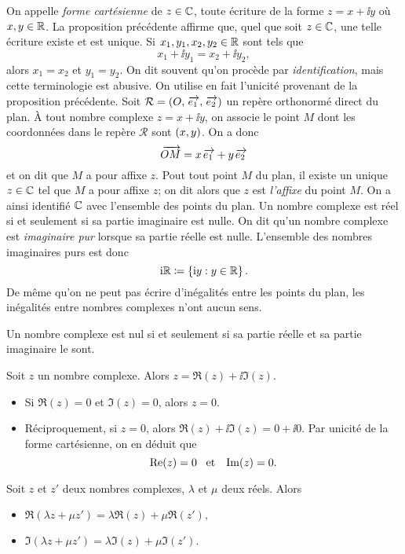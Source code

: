 \documentclass{magnolia}
\begin{document}
\begin{remarques}
\remarque On appelle \emph{forme cartésienne} de $z\in\mathbb{C}$, toute écriture de la forme $z=x+\ii y$ où $x,y\in\mathbb{R}$. La proposition précédente affirme que, quel que soit $z\in\mathbb{C}$, une telle écriture existe et est unique.
\remarque Si $x_1,y_1,x_2,y_2\in\mathbb{R}$ sont tels que
  \[x_1+\ii y_1=x_2+\ii y_2,\]
  alors $x_1=x_2$ et $y_1=y_2$. On dit souvent qu'on procède par \emph{identification}, mais cette terminologie est abusive. On utilise en fait l'unicité provenant de la proposition précédente.
\remarque Soit $\mathcal{R}=\left(O,\kern 2pt\overrightarrow{\kern -2pte_1},\kern 2pt\overrightarrow{\kern -2pte_2}\right)$ un repère orthonormé
  direct du plan. À tout nombre complexe $z=x+\ii y$, on associe le point $M$ dont les coordonnées dans le repère
  $\mathcal{R}$ sont $\left(x,y\right)$. On a donc
  \[\kern 2pt\overrightarrow{\kern -2ptOM}=x\kern 2pt\overrightarrow{\kern -2pte_1}+y\kern 2pt\overrightarrow{\kern -2pte_2}\]
  et on dit que $M$ a pour affixe $z$. Pout tout point $M$ du plan, il existe un unique $z\in\mathbb{C}$ tel que
  $M$ a pour affixe $z$; on dit alors que $z$ est \emph{l'affixe} du point $M$. On a ainsi identifié
  $\mathbb{C}$ avec l'ensemble des points du plan.
\remarque Un nombre complexe est réel si et seulement si sa partie imaginaire est nulle. On dit qu'un nombre complexe
  est \emph{imaginaire pur} lorsque sa partie réelle est nulle. L'ensemble des nombres imaginaires purs est
  donc
  \[{\rm i}\mathbb{R}\coloneqq\left\{{\rm i} y : y\in\mathbb{R}\right\}.\]
\remarque De même qu'on ne peut pas écrire d'inégalités entre les points du plan, les inégalités entre nombres
  complexes n'ont aucun sens.
\end{remarques}

\begin{proposition}[utile=-3]
Un nombre complexe est nul si et seulement si sa partie réelle et sa partie imaginaire le sont.
\end{proposition}

\begin{preuve}
Soit $z$ un nombre complexe. Alors $z=\Re(z)+\ii \Im(z)$. 
\begin{itemize}
\item Si $\Re(z)=0$ et $\Im(z)=0$, alors $z=0$.
\item Réciproquement, si $z=0$, alors $\Re(z)+\ii \Im(z)=0+\ii 0$. Par unicité de la forme cartésienne, on en déduit que
  \[\mathop{\rm Re}(z)=0 \quad\!\text{et}\quad\! \mathop{\rm Im}(z)=0.\]
\end{itemize}
\end{preuve}

\begin{proposition}[utile=-3]
Soit $z$ et $z'$ deux nombres complexes, $\lambda$ et $\mu$ deux réels. Alors
\begin{itemize}
\item $\Re(\lambda z+\mu z')=\lambda\Re(z)+\mu\Re(z'),$
\item $\Im(\lambda z+\mu z')=\lambda\Im(z)+\mu\Im(z').$
\end{itemize}
\end{proposition}
\end{document}
